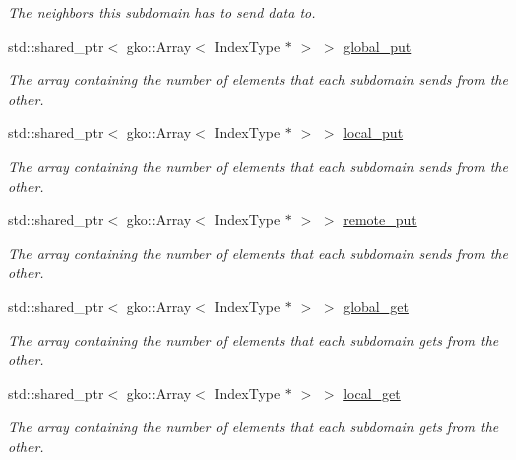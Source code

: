 \begin{DoxyCompactItemize}
\begin{DoxyCompactList}\small\item\em The neighbors this subdomain has to send data to. \end{DoxyCompactList}\item 
std\+::shared\+\_\+ptr$<$ gko\+::\+Array$<$ Index\+Type $\ast$ $>$ $>$ \hyperlink{structschwz_1_1Communicate_1_1comm__struct_a2fb26c3f0a44cf875080a8d36b082150}{global\+\_\+put}
\begin{DoxyCompactList}\small\item\em The array containing the number of elements that each subdomain sends from the other. \end{DoxyCompactList}\item 
std\+::shared\+\_\+ptr$<$ gko\+::\+Array$<$ Index\+Type $\ast$ $>$ $>$ \hyperlink{structschwz_1_1Communicate_1_1comm__struct_a62a9e5c1988b1bf948148ff2f137a900}{local\+\_\+put}
\begin{DoxyCompactList}\small\item\em The array containing the number of elements that each subdomain sends from the other. \end{DoxyCompactList}\item 
std\+::shared\+\_\+ptr$<$ gko\+::\+Array$<$ Index\+Type $\ast$ $>$ $>$ \hyperlink{structschwz_1_1Communicate_1_1comm__struct_a977cf8a2800021a50e59ee5cefb2a0ca}{remote\+\_\+put}
\begin{DoxyCompactList}\small\item\em The array containing the number of elements that each subdomain sends from the other. \end{DoxyCompactList}\item 
std\+::shared\+\_\+ptr$<$ gko\+::\+Array$<$ Index\+Type $\ast$ $>$ $>$ \hyperlink{structschwz_1_1Communicate_1_1comm__struct_a4df6a8d7932d277cfd4d8e8ec3ab7096}{global\+\_\+get}
\begin{DoxyCompactList}\small\item\em The array containing the number of elements that each subdomain gets from the other. \end{DoxyCompactList}\item 
std\+::shared\+\_\+ptr$<$ gko\+::\+Array$<$ Index\+Type $\ast$ $>$ $>$ \hyperlink{structschwz_1_1Communicate_1_1comm__struct_a924b4a6e72c9e9b973c90f9753bc070b}{local\+\_\+get}
\begin{DoxyCompactList}\small\item\em The array containing the number of elements that each subdomain gets from the other. \end{DoxyCompactList}\item 

\end{DoxyCompactItemize}
